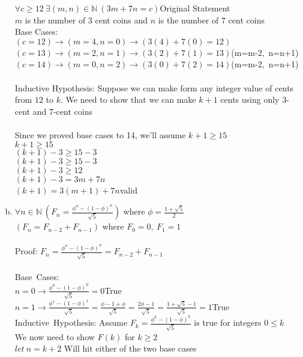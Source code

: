 \documentclass[11pt,letterpaper]{article}
\begin{document}
\begin{enumerate}[(a)]
$\forall c\geq 12~\exists(m,n)\in\mathbb{N}~(3m + 7n = c)$\hfill Original Statement\\
$m$ is the number of 3 cent coins and $n$ is the number of 7 cent coins\\
Base Cases:\\
$(c=12)\rightarrow (m=4,n=0)\rightarrow (3(4) + 7(0) = 12)$\\
$(c=13)\rightarrow (m=2,n=1)\rightarrow (3(2) + 7(1) = 13)$\hfill (m=m-2,~n=n+1)\\
$(c=14)\rightarrow (m=0,n=2)\rightarrow (3(0) + 7(2) = 14)$\hfill (m=m-2,~n=n+1)\\\\
Inductive Hypothesis: Suppose we can make form any integer value of cents from $12$ to $k$. We need to show that we can make $k+1$ cents using only 3-cent and 7-cent coins\\\\
Since we proved base cases to 14, we'll assume $k+1\geq 15$\\
$k+1\geq 15$\\
$(k+1)-3\geq 15-3$\\
$(k+1)-3\geq 15-3$\\
$(k+1)-3\geq 12$\\
$(k+1)-3=3m +7n$\\
$(k+1)=3(m+1) +7n$\hfill valid\\
\clearpage
\item
$\forall n\in\mathbb{N}~(F_n = \frac{\phi^n-(1-\phi)^n}{\sqrt{5}})$ where $\phi = \frac{1+\sqrt{5}}{2}$\\
$(F_n = F_{n-2} +F_{n-1})$ where $F_0 = 0,~F_1 =1$\\
\\
Proof: $F_n = \frac{\phi^n-(1-\phi)^n}{\sqrt{5}}= F_{n-2} +F_{n-1}$\\
\\
Base~Cases:\\
$n=0\rightarrow \frac{\phi^0-(1-\phi)^0}{\sqrt{5}} = 0$\hfill True\\
$n=1\rightarrow \frac{\phi^1-(1-\phi)^1}{\sqrt{5}} = \frac{\phi- 1+\phi}{\sqrt{5}}=\frac{2\phi -1}{\sqrt{5}}=\frac{1+\sqrt{5}-1}{\sqrt{5}}=1$\hfill True\\
Inductive~Hypothesis: Assume $F_k = \frac{\phi^k-(1-\phi)^k}{\sqrt{5}}$ is true for integers $0 \leq k$\\
We now need to show $F(k)$ for $k\geq2$\\
$let~n=k+2$ \hfill Will hit either of the two base cases\\
\\

\end{enumerate}
\end{document}
